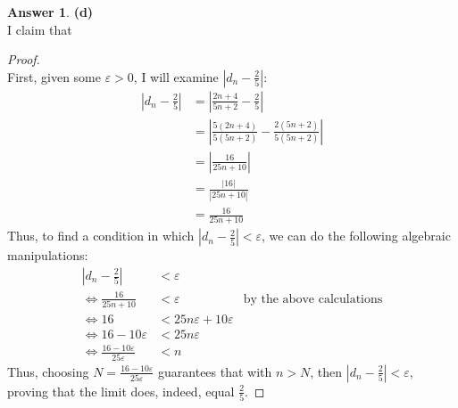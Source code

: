 \documentclass[10pt,a4paper]{article}
\theoremstyle{definition}
\newtheorem*{answer*}{Answer}
\begin{document}
\begin{answer*}{\textbf{(d)}}
\\I claim that 
\begin{proof}{$ $}
\\First, given some $\varepsilon > 0$, I will examine $\displaystyle \left|d_n - \frac{2}{5}\right|$:
\begin{align*}
\left|d_n - \frac{2}{5}\right| &= \left|\frac{2n + 4}{5n + 2} - \frac{2}{5}\right|\\
&= \left|\frac{5(2n + 4)}{5(5n + 2)} - \frac{2(5n + 2)}{5(5n + 2)}\right|\\
&= \left|\frac{16}{25n + 10}\right|\\
&= \frac{|16|}{|25n + 10|}\\
&= \frac{16}{25n + 10}
\end{align*}
Thus, to find a condition in which $\displaystyle \left|d_n - \frac{2}{5}\right| < \varepsilon$, we can do the following algebraic manipulations:
\begin{align*}
\left|d_n - \frac{2}{5}\right| &< \varepsilon\\
\iff \frac{16}{25n + 10} &< \varepsilon &\text{by the above calculations}\\
\iff 16 &< 25n\varepsilon + 10\varepsilon\\
\iff 16 - 10\varepsilon &< 25n\varepsilon\\
\iff \frac{16 - 10\varepsilon}{25\varepsilon} &< n
\end{align*}
Thus, choosing $\displaystyle N = \frac{16 - 10\varepsilon}{25\varepsilon}$ guarantees that with $n > N$, then $\displaystyle \left|d_n - \frac{2}{5}\right| < \varepsilon$, proving that the limit does, indeed, equal $\displaystyle \frac{2}{5}$.
\end{proof}
\end{answer*}
\end{document}
